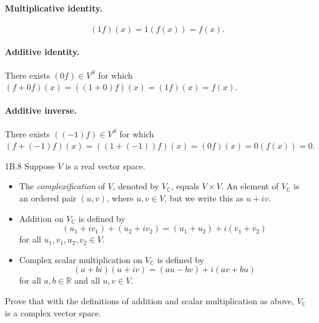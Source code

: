 \documentclass{exam}
\begin{document}
\paragraph{Multiplicative identity.} $$(1f)(x) = 1(f(x)) = f(x).$$

\paragraph{Additive identity.} 
\begin{center}
    There exists $(0f)\in V^S$ for which $(f + 0f)(x) = ((1 + 0)f)(x) = (1f)(x) = f(x).$
\end{center}

\paragraph{Additive inverse.} 
\begin{center}
    There exists $((-1)f)\in V^S$ for which $(f + (-1)f)(x) = ((1 + (-1))f)(x) = (0f)(x) = 0(f(x)) = 0.$
\end{center}

\begin{problem}{1B.8}
    Suppose $V$ is a real vector space.
    \begin{itemize}
        \item The \textit{complexification} of $V$, denoted by $V_{\mathbb C}$, equals $V\times V$. An element of $V_{\mathbb C}$ is an ordered pair $(u, v)$, where $u,v\in V$, but we write this as $u + iv$.
        \item Addition on $V_{\mathbb C}$ is defined by $$(u_1 + i v_1) + (u_2 + iv_2) = (u_1 + u_2) + i(v_1 + v_2)$$ for all $u_1,v_1,u_2,v_2\in V$.
        \item Complex scalar multiplication on $V_{\mathbb C}$ is defined by $$(a+bi)(u+iv) = (au - bv) + i(av + bu)$$ for all $a, b\in\mathbb R$ and all $u,v\in V$.
    \end{itemize}
    Prove that with the definitions of addition and scalar multiplication as above, $V_{\mathbb C}$ is a complex vector space.
\end{problem}
\end{document}
